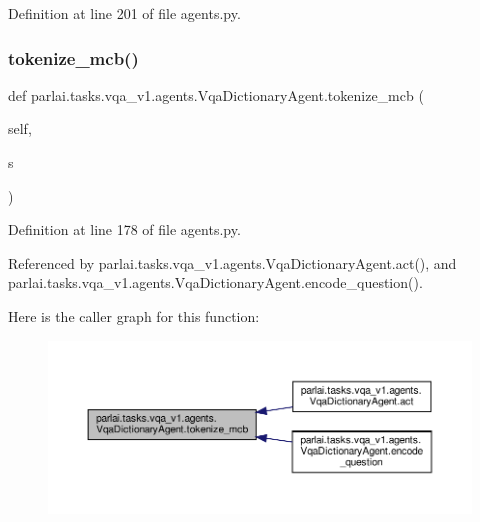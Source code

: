 Definition at line 201 of file agents.\+py.

\mbox{\label{classparlai_1_1tasks_1_1vqa__v1_1_1agents_1_1VqaDictionaryAgent_aa4945260a8e445852d28d702346b67e2}} 
\subsubsection{\texorpdfstring{tokenize\+\_\+mcb()}{tokenize\_mcb()}}
{\footnotesize\ttfamily def parlai.\+tasks.\+vqa\+\_\+v1.\+agents.\+Vqa\+Dictionary\+Agent.\+tokenize\+\_\+mcb (\begin{DoxyParamCaption}\item[{}]{self,  }\item[{}]{s }\end{DoxyParamCaption})}



Definition at line 178 of file agents.\+py.



Referenced by parlai.\+tasks.\+vqa\+\_\+v1.\+agents.\+Vqa\+Dictionary\+Agent.\+act(), and parlai.\+tasks.\+vqa\+\_\+v1.\+agents.\+Vqa\+Dictionary\+Agent.\+encode\+\_\+question().

Here is the caller graph for this function\+:
\nopagebreak
\begin{figure}[H]
\begin{center}
\leavevmode
\includegraphics[width=350pt]{classparlai_1_1tasks_1_1vqa__v1_1_1agents_1_1VqaDictionaryAgent_aa4945260a8e445852d28d702346b67e2_icgraph}
\end{center}
\end{figure}


